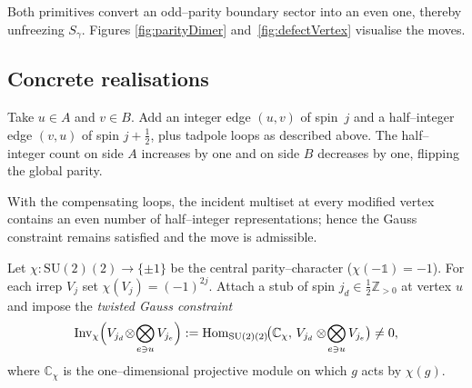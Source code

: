 \documentclass[11pt]{article}
\newcommand{\SU}{\mathrm{SU}(2)}
\newcommand{\Inv}{\mathrm{Inv}}
\newcommand{\Cut}{\gamma}
\begin{document}
Both primitives convert an odd–parity boundary sector into an even one,
thereby unfreezing $S_\Cut$.  Figures \ref{fig:parityDimer}
and~\ref{fig:defectVertex} visualise the moves.

\subsection*{Concrete realisations}

\begin{example}\label{ex:paritydimer}
  Take $u\in A$ and $v\in B$.  Add an integer edge $(u,v)$ of spin~$j$ and a
  half–integer edge $(v,u)$ of spin $j+\tfrac12$, plus tadpole loops as
  described above.  The half–integer count on side $A$ increases by one and
  on side $B$ decreases by one, flipping the global parity.
\end{example}

\begin{lemma}\label{lem:dimerGauge}
  With the compensating loops, the incident multiset at every modified
  vertex contains an even number of half–integer representations; hence
  the Gauss constraint remains satisfied and the move is admissible.
\end{lemma}

\begin{definition}\label{def:defectAdmissible}
  Let \(\chi:\SU(2)\!\to\!\{\pm1\}\) be the central parity–character
  (\(\chi(-\mathbb1)=-1\)).
  For each irrep \(V_j\) set \(\chi(V_j)=(-1)^{2j}\).
  Attach a stub of spin \(j_d\in\tfrac12\mathbb Z_{>0}\) at vertex \(u\) and
  impose the \emph{twisted Gauss constraint}
  \[
    \Inv_{\chi}\Bigl(
      V_{j_d}\!\otimes\!\bigotimes_{e\ni u} V_{j_e}
    \Bigr)
    :=\operatorname{Hom}_{\SU(2)}\!\bigl(
      \mathbb C_{\chi},\,
      V_{j_d}\otimes\!\bigotimes_{e\ni u} V_{j_e}
    \bigr)\neq0,
  \]
  where \(\mathbb C_{\chi}\) is the one–dimensional projective module on
  which \(g\) acts by \(\chi(g)\).
\end{definition}
\end{document}
